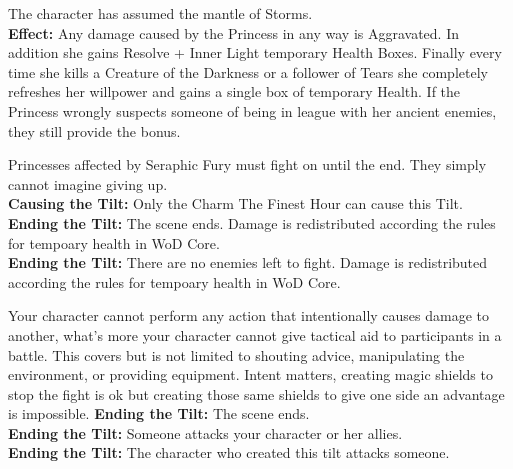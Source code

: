 \documentclass[10pt, frontgrid, backgrid]{flacards}
\begin{document}

{The character has assumed the mantle of Storms. \\
\textbf{Effect:} Any damage caused by the Princess in any way is Aggravated. In addition she gains Resolve + Inner Light temporary Health Boxes. Finally every time she kills a Creature of the Darkness or a follower of Tears she completely refreshes her willpower and gains a single box of temporary Health. If the Princess wrongly suspects someone of being in league with her ancient enemies, they still provide the bonus.

Princesses affected by Seraphic Fury must fight on until the end. They simply cannot imagine giving up.\\

\textbf{Causing the Tilt:} Only the Charm The Finest Hour can cause this Tilt.\\
\textbf{Ending the Tilt:} The scene ends. Damage is redistributed according the rules for tempoary health in WoD Core.\\
\textbf{Ending the Tilt:} There are no enemies left to fight. Damage is redistributed according the rules for tempoary health in WoD Core.
}

{Your character cannot perform any action that intentionally causes damage to another, what's more your character cannot give tactical aid to participants in a battle. This covers but is not limited to shouting advice, manipulating the environment, or providing equipment. Intent matters, creating magic shields to stop the fight is ok but creating those same shields to give one side an advantage is impossible. 
\textbf{Ending the Tilt:} The scene ends.\\
\textbf{Ending the Tilt:} Someone attacks your character or her allies.\\
\textbf{Ending the Tilt:} The character who created this tilt attacks someone.}
\end{document}
